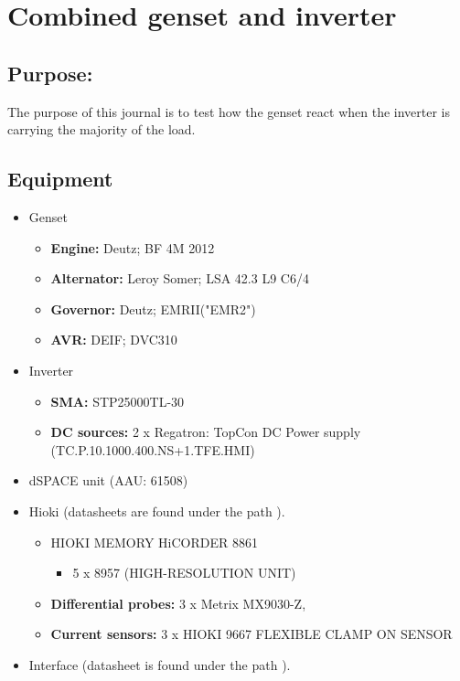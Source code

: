 \section{Combined genset and inverter}
\label{app:combined_genset_and_inverter}
\subsection*{Purpose:}
The purpose of this journal is to test how the genset react when the inverter is carrying the majority of the load. 

\subsection*{Equipment}

\begin{itemize}
	\item Genset
		\begin{itemize}
			\item \textbf{Engine:} Deutz; BF 4M 2012
			\item \textbf{Alternator:} Leroy Somer; LSA 42.3 L9 C6/4
			\item \textbf{Governor:} Deutz; EMRII("EMR2")
			\item \textbf{AVR:} DEIF; DVC310 
		\end{itemize}
		\item Inverter
		\begin{itemize}
			\item \textbf{SMA:} STP25000TL-30
			\item \textbf{DC sources:} 2 x Regatron: TopCon DC Power supply \newline (TC.P.10.1000.400.NS+1.TFE.HMI)
		\end{itemize}
		\item dSPACE unit (AAU: 61508)
		\item Hioki (datasheets are found under the path ).
		\begin{itemize}
			\item HIOKI MEMORY HiCORDER 8861
			\begin{itemize}
				\item 5 x 8957 (HIGH-RESOLUTION UNIT)
			\end{itemize}
			\item \textbf{Differential probes:} 3 x Metrix MX9030-Z,
			\item \textbf{Current sensors:} 3 x HIOKI 9667 FLEXIBLE CLAMP ON SENSOR
		\end{itemize}
		\item Interface (datasheet is found under the path ).
\end{itemize}	


